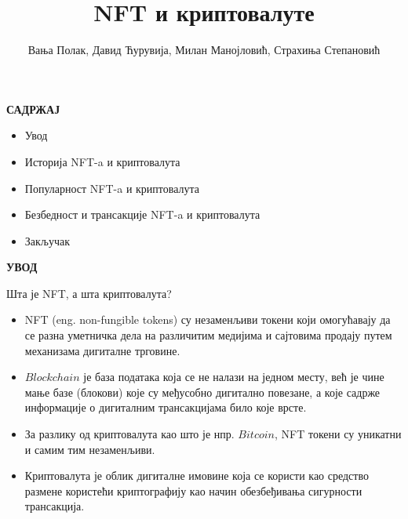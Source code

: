 \documentclass{beamer}
\title[NFT и криптовалуте]{NFT и криптовалуте}
\author{Вања Полак, Давид Ћурувија, Милан Манојловић, Страхиња Степановић}
\institute[Математички факултет] 
{
\texttt{[image: hs-mittweida]}
\\[0.2in]
\medskip
Техничко и научно писање 
}
\begin{document}
\begin{frame}
\titlepage 
\end{frame}

\begin{frame}
{\large\textbf{САДРЖАЈ}}
\begin{itemize}
	\item Увод
	\item Историја NFT-a и криптовалута
	\item Популарност NFT-a и криптовалута
	\item Безбедност и трансакције NFT-a и криптовалута
	\item Закључак
\end{itemize}
\end{frame}

\begin{frame}
{\large\textbf{УВОД}}
\begin{center}
\textcolor[rgb]{0,0,0.55}{\colorbox[rgb]{0,0,1}{\textcolor[rgb]{1,1,1}{Шта је NFT, а шта криптовалута?}}}
\end{center}
\begin{itemize}
   \item NFT (eng. non-fungible tokens) су незаменљиви токени који омогућавају да се разна уметничка дела на различитим медијима и сајтовима продају путем механизама дигиталне трговине.
	 \item \(Blockchain\) је база података која се не налази на једном месту, већ је чине мање базе (блокови) које су међусобно дигитално повезане, а које садрже информације о дигиталним трансакцијама било које врсте.
	 \item За разлику од криптовалута као што је нпр. \(Bitcoin\), NFT токени су уникатни и самим тим незаменљиви.
	 \item Криптовалута је облик дигиталне имовине која се користи као средство размене користећи криптографију као начин обезбеђивања сигурности трансакција.
\end{itemize} 
\end{frame}
\end{document}
